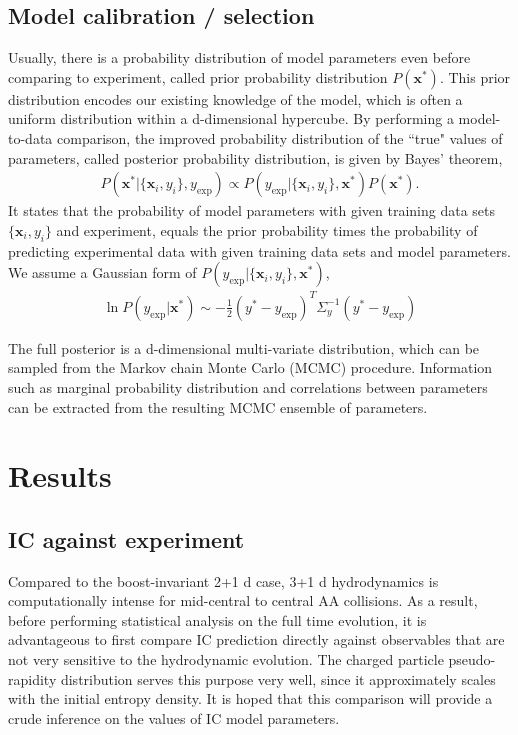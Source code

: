 \documentclass[aps,prl,twocolumn,groupedaddress]{revtex4-1}
\begin{document}
	\subsection{Model calibration / selection}
	Usually, there is a probability distribution of model parameters even before comparing  to experiment, called prior probability distribution $P(\mathbf{x}^*)$. 
	This prior distribution encodes our existing knowledge of the model, which is often a uniform distribution within a d-dimensional hypercube. 
	By performing a model-to-data comparison, the improved probability distribution of the ``true" values of parameters, called posterior probability distribution, is given by Bayes' theorem,
	\begin{eqnarray}
		P(\mathbf{x}^*|\{\mathbf{x}_i, y_i\}, y_\textrm{exp}) \propto P(y_\textrm{exp}|\{\mathbf{x}_i, y_i\}, \mathbf{x}^*) P(\mathbf{x}^*).
	\end{eqnarray}
	It states that the probability of model parameters with given training data sets $\{\mathbf{x}_i, y_i\}$ and experiment, equals the prior probability times the probability of predicting experimental data with given training data sets and model parameters.
	We assume a Gaussian form of $P(y_\textrm{exp}|\{\mathbf{x}_i, y_i\}, \mathbf{x}^*)$,
	\begin{eqnarray}
	\ln P(y_\textrm{exp}|\mathbf{x}^*) \sim -\frac{1}{2}(y^* - y_\textrm{exp})^T\Sigma_y^{-1}(y^* - y_\textrm{exp})
	\end{eqnarray}
	
	The full posterior is a d-dimensional multi-variate distribution, which can be sampled from the Markov chain Monte Carlo (MCMC) procedure. 
	Information such as marginal probability distribution and correlations between parameters can be extracted from the resulting MCMC ensemble of parameters.
	
\section{Results}
	\subsection{IC against experiment}
	Compared to the boost-invariant 2+1 d case, 3+1 d hydrodynamics is computationally intense for mid-central to central AA collisions. 
	As a result, before performing statistical analysis on the full time evolution, it is advantageous to first compare IC prediction directly against observables that are not very sensitive to the hydrodynamic evolution. 
	The charged particle pseudo-rapidity distribution serves this purpose very well, since it approximately scales with the initial entropy density.
	It is hoped that this comparison will provide a crude inference on the values of IC model parameters.
\end{document}
